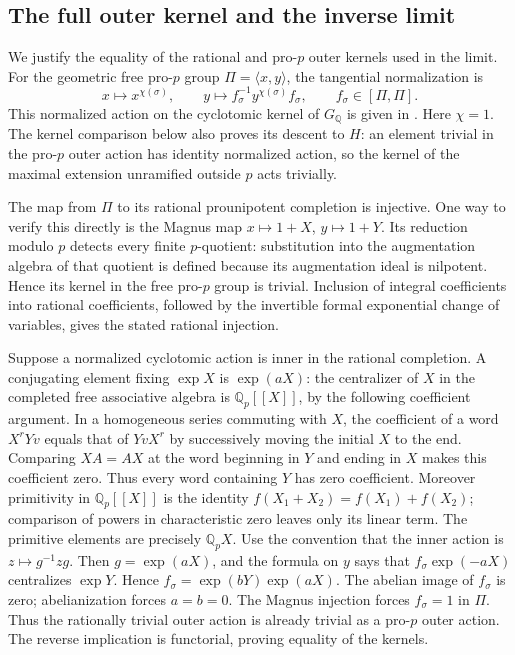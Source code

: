 \subsection{The full outer kernel and the inverse limit}

We justify the equality of the rational and pro-\(p\)
outer kernels used in the limit.  For the geometric
free pro-\(p\) group \(\Pi=\langle x,y\rangle\),
the tangential normalization is
\[
 x\longmapsto x^{\chi(\sigma)},\qquad
 y\longmapsto f_\sigma^{-1}y^{\chi(\sigma)}f_\sigma,
 \qquad f_\sigma\in[\Pi,\Pi].
\]
This normalized action on the cyclotomic kernel of \(G_{\mathbb Q}\) is given in
\cite[\S2, (2.1) and the following paragraph, author
p.~7]{NakamuraSchneps2000}. Here \(\chi=1\). The kernel comparison below also proves its descent to \(H\): an element trivial in the pro-\(p\) outer action has identity normalized action, so the kernel of the maximal extension unramified outside \(p\) acts trivially.

The map from \(\Pi\) to its rational prounipotent
completion is injective.  One way to verify this
directly is the Magnus map \(x\mapsto1+X\),
\(y\mapsto1+Y\).  Its reduction modulo \(p\)
detects every finite \(p\)-quotient: substitution
into the augmentation algebra of that quotient
is defined because its augmentation ideal is
nilpotent.  Hence its kernel in the free pro-\(p\)
group is trivial.  Inclusion of integral
coefficients into rational coefficients, followed
by the invertible formal exponential change of
variables, gives the stated rational injection.

Suppose a normalized cyclotomic action
is inner in the rational completion.  A conjugating
element fixing \(\exp X\) is \(\exp(aX)\):
the centralizer of \(X\) in the completed free
associative algebra is \(\mathbb Q_p[[X]]\),
by the following coefficient argument. In a homogeneous series commuting with \(X\), the coefficient of a word \(X^rYv\) equals that of \(YvX^r\) by successively moving the initial \(X\) to the end. Comparing \(XA=AX\) at the word beginning in \(Y\) and ending in \(X\) makes this coefficient zero. Thus every word containing \(Y\) has zero coefficient. Moreover primitivity in \(\mathbb Q_p[[X]]\) is the identity \(f(X_1+X_2)=f(X_1)+f(X_2)\); comparison of powers in characteristic zero leaves only its linear term. The primitive elements are precisely
\(\mathbb Q_pX\).
Use the convention that the inner action is \(z\mapsto g^{-1}zg\). Then \(g=\exp(aX)\), and the formula on \(y\) says that \(f_\sigma\exp(-aX)\) centralizes \(\exp Y\). Hence \(f_\sigma=\exp(bY)\exp(aX)\).
The abelian image of \(f_\sigma\) is zero;
abelianization forces \(a=b=0\).
The Magnus injection forces \(f_\sigma=1\)
in \(\Pi\).  Thus the rationally trivial
outer action is already trivial as a pro-\(p\)
outer action.  The reverse implication is
functorial, proving equality of the kernels.

